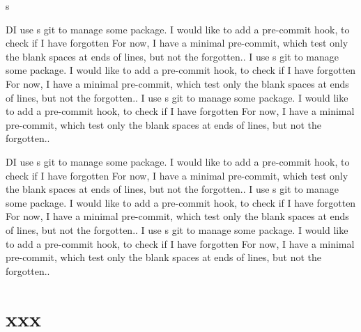\documentclass[a4paper, twoside, 12pt]{book}
\begin{document}
s
\newpage

\beginnumbering
\beforeeledchapter
\pstart
{}
\pend
\pstart
DI use s git to manage some package.
I would like to add a pre-commit hook, to check if I have forgotten
For now, I have a minimal pre-commit, which test only the blank spaces at ends of lines, but not the forgotten..
\pend
\pstart
{}
\pend
\pstart
{}
\pend
\pstart
{}
\pend
\pstart
{}I use s git to manage some package.
I would like to add a pre-commit hook, to check if I have forgotten
For now, I have a minimal pre-commit, which test only the blank spaces at ends of lines, but not the forgotten..
\pend
\pstart
{}
\pend
\pstart
{}I use s git to manage some package.
I would like to add a pre-commit hook, to check if I have forgotten
For now, I have a minimal pre-commit, which test only the blank spaces at ends of lines, but not the forgotten..
\pend

\beforeeledchapter
\pstart
{}
\pend
\pstart
DI use s git to manage some package.
I would like to add a pre-commit hook, to check if I have forgotten
For now, I have a minimal pre-commit, which test only the blank spaces at ends of lines, but not the forgotten..
\pend
\pstart
{}
\pend
\pstart
{}
\pend
\pstart
{}
\pend
\pstart
{}I use s git to manage some package.
I would like to add a pre-commit hook, to check if I have forgotten
For now, I have a minimal pre-commit, which test only the blank spaces at ends of lines, but not the forgotten..
\pend
\pstart
{}
\pend
\pstart
{}I use s git to manage some package.
I would like to add a pre-commit hook, to check if I have forgotten
For now, I have a minimal pre-commit, which test only the blank spaces at ends of lines, but not the forgotten..
\pend


\endnumbering

\newpage
\section*{xxx}
\end{document}
